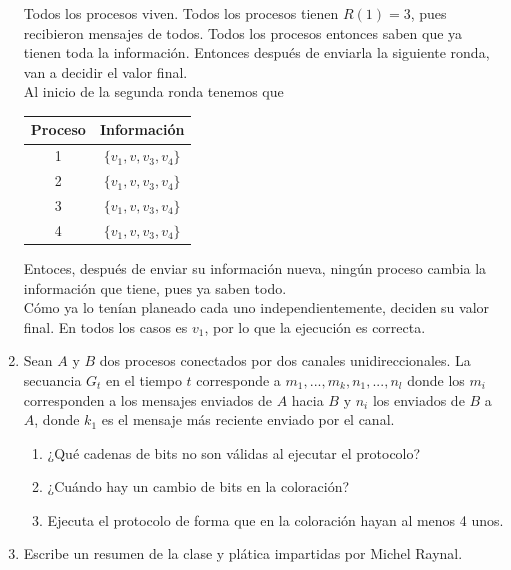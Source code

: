 \documentclass[12pt,a4paper]{report}
\begin{document}
\begin{enumerate}
{\begin{enumerate} [label = \alph*)]
{				Todos los procesos viven. Todos los procesos tienen $R(1) = 3$, pues
				recibieron mensajes de todos. Todos los procesos entonces saben que
				ya tienen toda la información. Entonces después de enviarla la siguiente
				ronda, van a decidir el valor final.\\

				Al inicio de la segunda ronda tenemos que

				\begin{center}
					\begin{tabular}{|c|c|}
						\hline
						Proceso & Información\\
						\hline
						1 & $\{v_1, v, v_3, v_4\}$\\
						\hline
						2 & $\{v_1, v, v_3, v_4\}$\\
						\hline
						3 & $\{v_1, v, v_3, v_4\}$\\
						\hline
						4 & $\{v_1, v, v_3, v_4\}$\\
						\hline
					\end{tabular}
				\end{center}
				Entoces, después de enviar su información nueva, ningún proceso cambia
				la información que tiene, pues ya saben todo.\\
				Cómo ya lo tenían planeado cada uno independientemente, deciden su valor
				final. En todos los casos es $v_1$, por lo que la ejecución es correcta.\\
			}
		\end{enumerate}

	}



	\item {
		Sean $A$ y $B$ dos procesos conectados por dos canales unidireccionales.
		La secuancia $G_t$ en el tiempo $t$ corresponde a $m_1, ..., m_k, n_1, ..., n_l$
		donde los $m_i$ corresponden a los mensajes enviados de $A$ hacia $B$ y $n_i$
		los enviados de $B$ a $A$, donde $k_1$ es el mensaje más reciente enviado
		por el canal.

		\begin{enumerate} [label = \alph*]
			\item {
				¿Qué cadenas de bits no son válidas al ejecutar el protocolo?
			}
			\item{
				¿Cuándo hay un cambio de bits en la coloración?
			}
			\item{
				Ejecuta el protocolo de forma que en la coloración hayan al menos 4 unos.
			}
		\end{enumerate}

	}

	\item{
		Escribe un resumen de la clase y plática impartidas por Michel Raynal.
	}

\end{enumerate}
\end{document}
